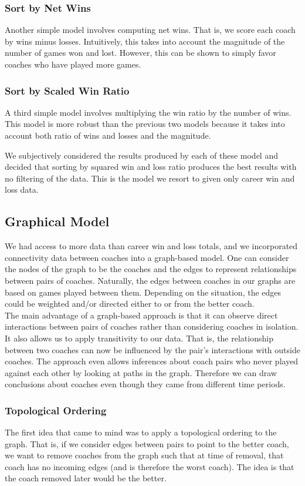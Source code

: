 \documentclass[11pt,notitlepage]{article}
\begin{document}
\subsubsection{Sort by Net Wins}
Another simple model involves computing net wins. That is, we score each coach by wins minus losses. Intuitively, this takes into account the magnitude of the number of games won and lost. However, this can be shown to simply favor coaches who have played more games. 

\subsubsection{Sort by Scaled Win Ratio}
A third simple model involves multiplying the win ratio by the number of wins. This model is more robust than the previous two models because it takes into account both ratio of wins and losses and the magnitude. 

We subjectively considered the results produced by each of these model and decided that sorting by squared win and loss ratio produces the best results with no filtering of the data. This is the model we resort to given only career win and loss data.

\subsection{Graphical Model}
We had access to more data than career win and loss totals, and we incorporated connectivity data between coaches into a graph-based model. One can consider the nodes of the graph to be the coaches and the edges to represent relationships between pairs of coaches. Naturally, the edges between coaches in our graphs are based on games played between them. Depending on the situation, the edges could be weighted and/or directed either to or from the better coach.
\\

\noindent The main advantage of a graph-based approach is that it can observe direct interactions between pairs of coaches rather than considering coaches in isolation. It also allows us to apply transitivity to our data. That is, the relationship between two coaches can now be influenced by the pair's interactions with outside coaches. The approach even allows inferences about coach pairs who never played against each other by looking at paths in the graph. Therefore we can draw conclusions about coaches even though they came from different time periods.

\subsubsection{Topological Ordering}
The first idea that came to mind was to apply a topological ordering to the graph. That is, if we consider edges between pairs to point to the better coach, we want to remove coaches from the graph such that at time of removal, that coach has no incoming edges (and is therefore the worst coach). The idea is that the coach removed later would be the better.
\\
\end{document}

